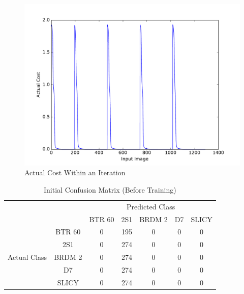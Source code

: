 \begin{figure}
	\centering
	\includegraphics[width=\textwidth]{figures/multilayer_perceptron_actual_cost}
	\caption{Actual Cost Within an Iteration}
	\label{fig:actual_cost}
	\centering
\end{figure}


\begin{table}
	\centering
	\begin{tabular}{|*{7}{c|}}
		
		\cline{3-7}
		\multicolumn{2}{c|}{}         & \multicolumn{5}{|c|}{Predicted Class} 			\\ \cline{3-7}
		\multicolumn{2}{c|}{}                  & BTR 60 & 2S1 & BRDM 2 & D7 & SLICY \\ \hline
		\multirow{5}{*}{\begin{turn}{90}Actual Class\end{turn}}
								      & BTR 60 & 0      & 195 & 0      & 0  & 0 	\\ \cline{2-7}
		                              & 2S1    & 0      & 274 & 0      & 0  & 0 	\\ \cline{2-7}
		                              & BRDM 2 & 0      & 274 & 0      & 0  & 0 	\\ \cline{2-7}
		                              & D7     & 0      & 274 & 0      & 0  & 0 	\\ \cline{2-7}
		                              & SLICY  & 0      & 274 & 0      & 0  & 0 	\\
		\hline
	\end{tabular}
	\label{tab:confusion0}
	\caption{Initial Confusion Matrix (Before Training)}
	\centering
\end{table}

